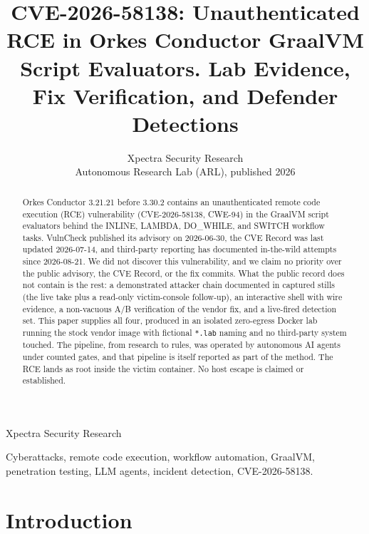 \documentclass[journal]{IEEEtran}
\begin{document}
\title{CVE-2026-58138: Unauthenticated RCE in Orkes Conductor GraalVM Script
Evaluators. Lab Evidence, Fix Verification, and Defender Detections}

\author{Xpectra Security Research\\[0.5ex]
\small Autonomous Research Lab (ARL), published 2026}

{Xpectra Security Research \MakeLowercase\expandafter\the\year}

\maketitle

\begin{abstract}
Orkes Conductor 3.21.21 before 3.30.2 contains an unauthenticated remote code
execution (RCE) vulnerability (CVE-2026-58138, CWE-94) in the GraalVM script
evaluators behind the INLINE, LAMBDA, DO\_WHILE, and SWITCH workflow tasks.
VulnCheck published its advisory on 2026-06-30, the CVE Record was last
updated 2026-07-14, and third-party reporting has documented in-the-wild
attempts since 2026-08-21. We did not discover this vulnerability, and we
claim no priority over the public advisory, the CVE Record, or the fix
commits. What the public record does not contain is the rest: a demonstrated
attacker chain documented in captured stills (the live take plus a read-only
victim-console follow-up), an
interactive shell with wire evidence, a non-vacuous A/B verification of the
vendor fix, and a
live-fired detection set. This paper supplies all four, produced in an
isolated zero-egress Docker lab running the stock vendor image with fictional
\texttt{*.lab} naming and no third-party system touched. The pipeline, from
research to rules, was operated by autonomous AI agents under counted gates,
and that pipeline is itself reported as part of the method. The RCE lands as
root inside the victim container. No host escape is claimed or established.
\end{abstract}

\begin{IEEEkeywords}
Cyberattacks, remote code execution, workflow automation, GraalVM, penetration
testing, LLM agents, incident detection, CVE-2026-58138.
\end{IEEEkeywords}

\section{Introduction}
\label{sec:intro}
\end{document}
